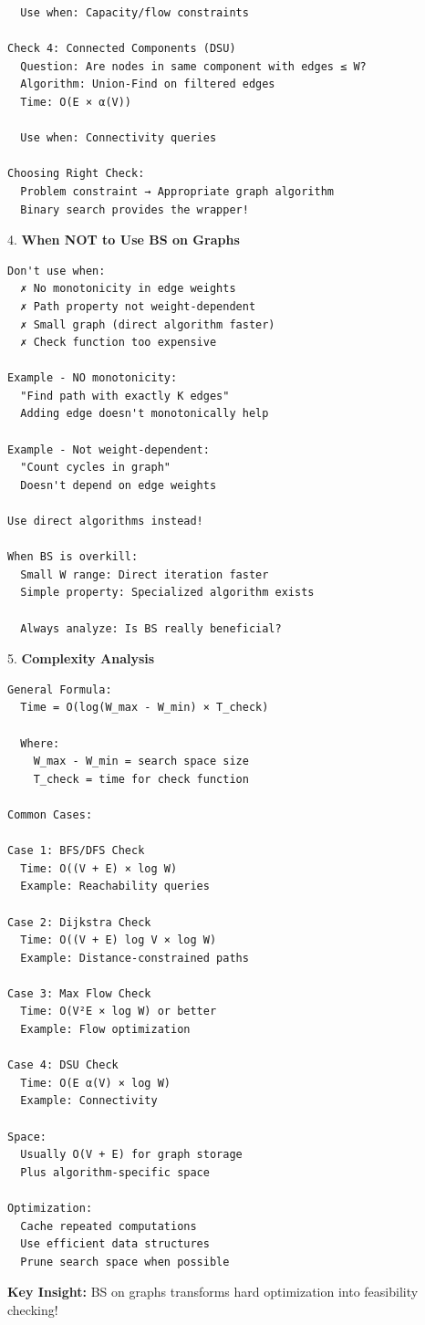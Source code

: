 \documentclass[11pt,a4paper,oneside]{book}
\begin{document}
\begin{tcolorbox}[
    enhanced,breakable,
    colback=white,
    colframe=deepblue,
    boxrule=1.5pt,
    arc=3mm,
    title=\textbf{The Bottleneck and Reachability Paradigm}
]
\begin{verbatim}
  Use when: Capacity/flow constraints

Check 4: Connected Components (DSU)
  Question: Are nodes in same component with edges ≤ W?
  Algorithm: Union-Find on filtered edges
  Time: O(E × α(V))
  
  Use when: Connectivity queries

Choosing Right Check:
  Problem constraint → Appropriate graph algorithm
  Binary search provides the wrapper!
\end{verbatim}

4. \textbf{When NOT to Use BS on Graphs}
\begin{verbatim}
Don't use when:
  ✗ No monotonicity in edge weights
  ✗ Path property not weight-dependent
  ✗ Small graph (direct algorithm faster)
  ✗ Check function too expensive

Example - NO monotonicity:
  "Find path with exactly K edges"
  Adding edge doesn't monotonically help
  
Example - Not weight-dependent:
  "Count cycles in graph"
  Doesn't depend on edge weights
  
Use direct algorithms instead!

When BS is overkill:
  Small W range: Direct iteration faster
  Simple property: Specialized algorithm exists
  
  Always analyze: Is BS really beneficial?
\end{verbatim}

5. \textbf{Complexity Analysis}
\begin{verbatim}
General Formula:
  Time = O(log(W_max - W_min) × T_check)
  
  Where:
    W_max - W_min = search space size
    T_check = time for check function

Common Cases:

Case 1: BFS/DFS Check
  Time: O((V + E) × log W)
  Example: Reachability queries
  
Case 2: Dijkstra Check  
  Time: O((V + E) log V × log W)
  Example: Distance-constrained paths

Case 3: Max Flow Check
  Time: O(V²E × log W) or better
  Example: Flow optimization

Case 4: DSU Check
  Time: O(E α(V) × log W)
  Example: Connectivity

Space:
  Usually O(V + E) for graph storage
  Plus algorithm-specific space

Optimization:
  Cache repeated computations
  Use efficient data structures
  Prune search space when possible
\end{verbatim}

\textbf{Key Insight:}
BS on graphs transforms hard optimization into feasibility checking!
\end{tcolorbox}
\end{document}
